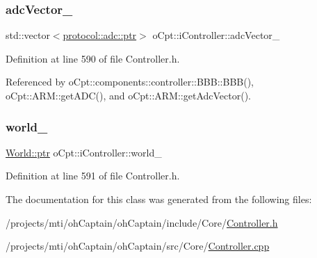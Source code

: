 \subsubsection{\texorpdfstring{adc\+Vector\+\_\+}{adcVector\_}}
{\footnotesize\ttfamily std\+::vector$<$\hyperlink{classo_cpt_1_1protocol_1_1adc_a94af68cb9c573629a4a1a16f8ebd3dff}{protocol\+::adc\+::ptr}$>$ o\+Cpt\+::i\+Controller\+::adc\+Vector\+\_\+\hspace{0.3cm}{\ttfamily [protected]}}



Definition at line 590 of file Controller.\+h.



Referenced by o\+Cpt\+::components\+::controller\+::\+B\+B\+B\+::\+B\+B\+B(), o\+Cpt\+::\+A\+R\+M\+::get\+A\+D\+C(), and o\+Cpt\+::\+A\+R\+M\+::get\+Adc\+Vector().

\hypertarget{classo_cpt_1_1i_controller_a77fe51158891ee7af9d5d92a3ff46b20}{}\label{classo_cpt_1_1i_controller_a77fe51158891ee7af9d5d92a3ff46b20} 
\subsubsection{\texorpdfstring{world\+\_\+}{world\_}}
{\footnotesize\ttfamily \hyperlink{classo_cpt_1_1_world_aa6e591e3096d5de71e0cec9039663d67}{World\+::ptr} o\+Cpt\+::i\+Controller\+::world\+\_\+\hspace{0.3cm}{\ttfamily [protected]}}



Definition at line 591 of file Controller.\+h.



The documentation for this class was generated from the following files\+:\begin{DoxyCompactItemize}
\item 
/projects/mti/oh\+Captain/oh\+Captain/include/\+Core/\hyperlink{_controller_8h}{Controller.\+h}\item 
/projects/mti/oh\+Captain/oh\+Captain/src/\+Core/\hyperlink{_controller_8cpp}{Controller.\+cpp}\end{DoxyCompactItemize}
